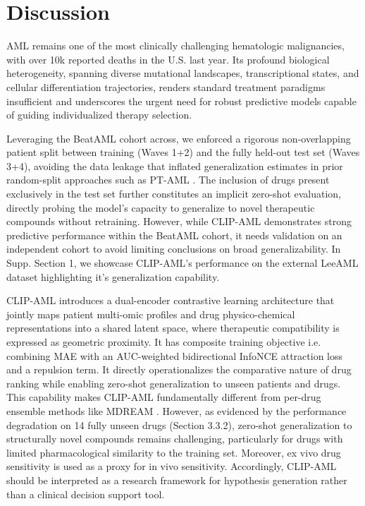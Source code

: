\documentclass[sigconf,authordraft]{acmart}
\begin{document}
\section{Discussion}
AML remains one of the most clinically challenging hematologic malignancies, with over 10k reported deaths in the U.S. last year. Its profound biological heterogeneity, spanning diverse mutational landscapes, transcriptional states, and cellular differentiation trajectories, renders standard treatment paradigms insufficient and underscores the urgent need for robust predictive models capable of guiding individualized therapy selection.

Leveraging the BeatAML cohort across, we enforced a rigorous non-overlapping patient split between training (Waves 1+2) and the fully held-out test set (Waves 3+4), avoiding the data leakage that inflated generalization estimates in prior random-split approaches such as PT-AML \cite{jani2024pt}. The inclusion of drugs present exclusively in the test set further constitutes an implicit zero-shot evaluation, directly probing the model's capacity to generalize to novel therapeutic compounds without retraining. However, while CLIP-AML demonstrates strong predictive performance within the BeatAML cohort, it needs validation on an independent cohort to avoid limiting conclusions on broad generalizability.
In Supp. Section 1, we showcase CLIP-AML's performance on the external LeeAML dataset highlighting it's generalization capability.

CLIP-AML introduces a dual-encoder contrastive learning architecture that jointly maps patient multi-omic profiles and drug physico-chemical representations into a shared latent space, where therapeutic compatibility is expressed as geometric proximity. It has composite training objective i.e. combining MAE with an AUC-weighted bidirectional InfoNCE attraction loss and a repulsion term. It directly operationalizes the comparative nature of drug ranking while enabling zero-shot generalization to unseen patients and drugs. This capability makes CLIP-AML fundamentally different from per-drug ensemble methods like MDREAM \cite{radford2021learning}. 
However, as evidenced by the performance degradation on 14 fully unseen drugs (Section 3.3.2), zero-shot generalization to structurally novel compounds remains challenging, particularly for drugs with limited pharmacological similarity to the training set. Moreover, ex vivo drug sensitivity is used as a proxy for in vivo sensitivity. Accordingly, CLIP-AML should be interpreted as a research framework for hypothesis generation rather than a clinical decision support tool.
\end{document}
